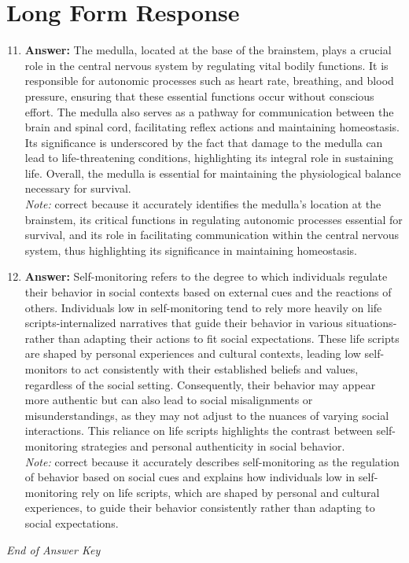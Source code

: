 \documentclass[12pt]{article}
\begin{document}
\section*{Long Form Response}
\begin{enumerate}[label=\arabic*.]
\setcounter{enumi}{10}
\item \textbf{Answer:} The medulla, located at the base of the brainstem, plays a crucial role in the central nervous system by regulating vital bodily functions. It is responsible for autonomic processes such as heart rate, breathing, and blood pressure, ensuring that these essential functions occur without conscious effort. The medulla also serves as a pathway for communication between the brain and spinal cord, facilitating reflex actions and maintaining homeostasis. Its significance is underscored by the fact that damage to the medulla can lead to life-threatening conditions, highlighting its integral role in sustaining life. Overall, the medulla is essential for maintaining the physiological balance necessary for survival.
\\ \textit{Note:} correct because it accurately identifies the medulla's location at the brainstem, its critical functions in regulating autonomic processes essential for survival, and its role in facilitating communication within the central nervous system, thus highlighting its significance in maintaining homeostasis.
\item \textbf{Answer:} Self-monitoring refers to the degree to which individuals regulate their behavior in social contexts based on external cues and the reactions of others. Individuals low in self-monitoring tend to rely more heavily on life scripts-internalized narratives that guide their behavior in various situations-rather than adapting their actions to fit social expectations. These life scripts are shaped by personal experiences and cultural contexts, leading low self-monitors to act consistently with their established beliefs and values, regardless of the social setting. Consequently, their behavior may appear more authentic but can also lead to social misalignments or misunderstandings, as they may not adjust to the nuances of varying social interactions. This reliance on life scripts highlights the contrast between self-monitoring strategies and personal authenticity in social behavior.
\\ \textit{Note:} correct because it accurately describes self-monitoring as the regulation of behavior based on social cues and explains how individuals low in self-monitoring rely on life scripts, which are shaped by personal and cultural experiences, to guide their behavior consistently rather than adapting to social expectations.
\end{enumerate}

\vfill
\noindent\textit{End of Answer Key}
\end{document}

